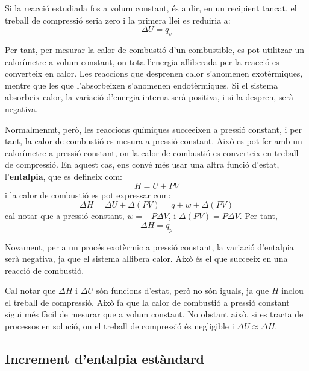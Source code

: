 Si la reacció estudiada fos a volum constant, és a dir, en un recipient tancat, el treball de compressió seria zero i la primera llei es reduiria a:
\begin{equation}
    \Delta U = q_v
\end{equation}

Per tant, per mesurar la calor de combustió d'un combustible, es pot utilitzar un calorímetre a volum constant, on tota l'energia alliberada per la reacció es converteix en calor. Les reaccions que desprenen calor s'anomenen exotèrmiques, mentre que les que l'absorbeixen s'anomenen endotèrmiques. Si el sistema absorbeix calor, la variació d'energia interna serà positiva, i si la despren, serà negativa.

Normalmenmt, però, les reaccions químiques succeeixen a pressió constant, i per tant, la calor de combustió es mesura a pressió constant. Això es pot fer amb un calorímetre a pressió constant, on la calor de combustió es converteix en treball de compressió. En aquest cas, ens convé més usar una altra funció d'estat, l'{\bf entalpia}, que es defineix com:
\begin{equation}
    H = U + PV
\end{equation}
i la calor de combustió es pot expressar com:
\begin{equation}
    \Delta H = \Delta U + \Delta (PV) = q+ w + \Delta (PV) \end{equation}
    cal notar que a pressió constant, $w = -P \Delta V$, i $\Delta (PV)=P\Delta V$. Per tant,
    \begin{equation}
    \Delta H = q_p
\end{equation}

Novament, per a un procés exotèrmic a pressió constant, la variació d'entalpia serà negativa, ja que el sistema allibera calor. Això és el que succeeix en una reacció de combustió.

Cal notar que $\Delta H$ i $\Delta U$ són funcions d'estat, però no són iguals, ja que $H$ inclou el treball de compressió. Això fa que la calor de combustió a pressió constant sigui més fàcil de mesurar que a volum constant. No obstant això, si es tracta de processos en solució, on el treball de compressió és negligible i $\Delta U \approx \Delta H$.

\subsection{Increment d'entalpia estàndard}

